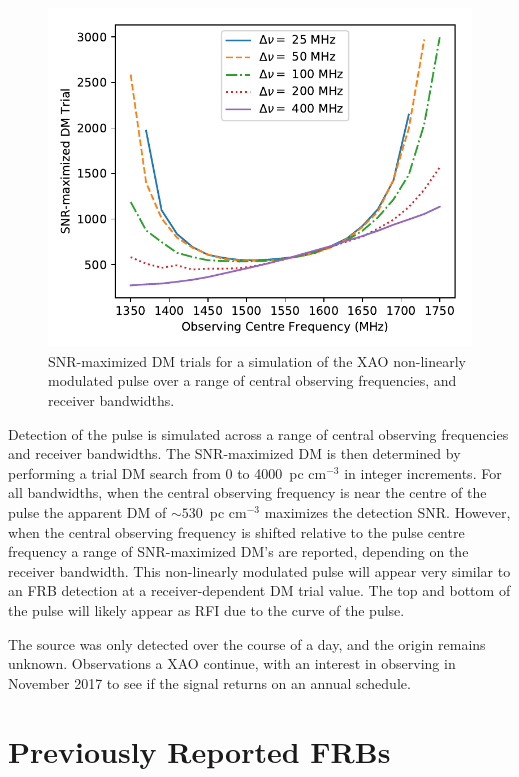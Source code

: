 \documentclass[a4paper,fleqn,usenatbib]{mnras}
\begin{document}
\begin{figure}
    \includegraphics[width=1.0\linewidth]{figures/simulatedRADARdm.pdf}
    \caption{SNR-maximized DM trials for a simulation of the XAO non-linearly
    modulated pulse over a range of central observing frequencies, and receiver
    bandwidths.
    }
    \label{fig:xao_simulated_dm}
\end{figure}

Detection of the pulse is simulated across a range of central observing
frequencies and receiver bandwidths. The SNR-maximized DM is then determined by
performing a trial DM search from 0 to 4000~pc cm$^{-3}$ in integer increments.
For all bandwidths, when the central observing frequency is near the centre of
the pulse the apparent DM of $\sim530$~pc cm$^{-3}$ maximizes the detection
SNR. However, when the central observing frequency is shifted relative to the
pulse centre frequency a range of SNR-maximized DM's are reported, depending on
the receiver bandwidth. This non-linearly modulated pulse will appear very
similar to an FRB detection at a receiver-dependent DM trial value. The top and
bottom of the pulse will likely appear as RFI due to the curve of the pulse.

The source was only detected over the course of a day, and the origin remains
unknown.  Observations a XAO continue, with an interest in observing in November
2017 to see if the signal returns on an annual schedule.

\section{Previously Reported FRBs}
\label{sec:previous_frbs}
\end{document}
